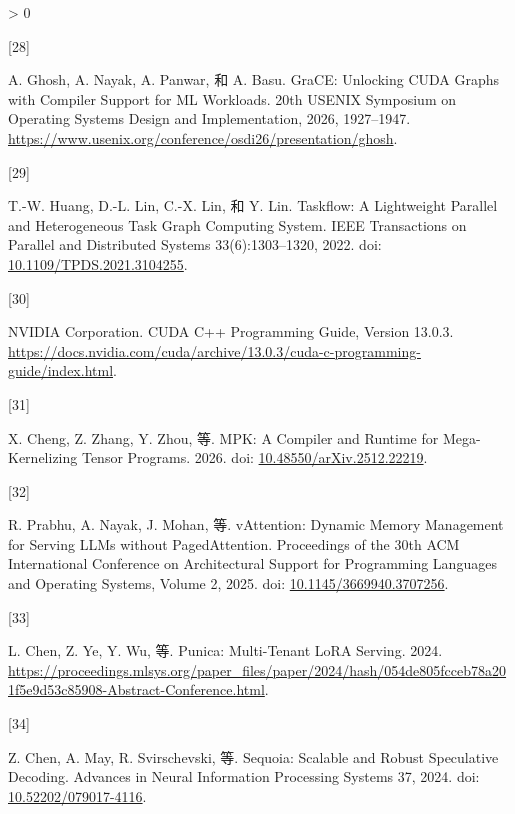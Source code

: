 \documentclass[
  UTF8,
  zihao=5]{ctexart}
\newlength{\cslhangindent}
\newlength{\csllabelwidth}
\newenvironment{CSLReferences}[2] %
 {%
  \setlength{\parindent}{0pt}
  \ifodd #1 \everypar{\setlength{\hangindent}{\cslhangindent}}\ignorespaces\fi
  \ifnum #2 > 0
  \setlength{\parskip}{#2\baselineskip}
  \fi
 }%
 {}
\newcommand{\CSLLeftMargin}[1]{\parbox[t]{\csllabelwidth}{#1}}
\newcommand{\CSLRightInline}[1]{\parbox[t]{\linewidth - \csllabelwidth}{#1}\par}
\begin{document}
\begin{CSLReferences}{0}{0}
\leavevmode{}%
\CSLLeftMargin{{[}28{]} }%
\CSLRightInline{A. Ghosh, A. Nayak, A. Panwar, 和 A. Basu. {GraCE}:
Unlocking {CUDA} Graphs with Compiler Support for {ML} Workloads. 20th
USENIX Symposium on Operating Systems Design and Implementation, 2026,
1927--1947.
\url{https://www.usenix.org/conference/osdi26/presentation/ghosh}.}

\leavevmode{}%
\CSLLeftMargin{{[}29{]} }%
\CSLRightInline{T.-W. Huang, D.-L. Lin, C.-X. Lin, 和 Y. Lin. {Taskflow:
A Lightweight Parallel and Heterogeneous Task Graph Computing System}.
IEEE Transactions on Parallel and Distributed Systems 33(6):1303--1320,
2022. doi:
\href{https://doi.org/10.1109/TPDS.2021.3104255}{10.1109/TPDS.2021.3104255}.}

\leavevmode{}%
\CSLLeftMargin{{[}30{]} }%
\CSLRightInline{NVIDIA Corporation. {CUDA C++ Programming Guide, Version
13.0.3}.
\url{https://docs.nvidia.com/cuda/archive/13.0.3/cuda-c-programming-guide/index.html}.}

\leavevmode{}%
\CSLLeftMargin{{[}31{]} }%
\CSLRightInline{X. Cheng, Z. Zhang, Y. Zhou, 等. MPK: A Compiler and
Runtime for Mega-Kernelizing Tensor Programs. 2026. doi:
\href{https://doi.org/10.48550/arXiv.2512.22219}{10.48550/arXiv.2512.22219}.}

\leavevmode{}%
\CSLLeftMargin{{[}32{]} }%
\CSLRightInline{R. Prabhu, A. Nayak, J. Mohan, 等. {vAttention}: Dynamic
Memory Management for Serving {LLMs} without {PagedAttention}.
Proceedings of the 30th ACM International Conference on Architectural
Support for Programming Languages and Operating Systems, Volume 2, 2025.
doi:
\href{https://doi.org/10.1145/3669940.3707256}{10.1145/3669940.3707256}.}

\leavevmode{}%
\CSLLeftMargin{{[}33{]} }%
\CSLRightInline{L. Chen, Z. Ye, Y. Wu, 等. Punica: Multi-Tenant LoRA
Serving. 2024.
\url{https://proceedings.mlsys.org/paper_files/paper/2024/hash/054de805fcceb78a201f5e9d53c85908-Abstract-Conference.html}.}

\leavevmode{}%
\CSLLeftMargin{{[}34{]} }%
\CSLRightInline{Z. Chen, A. May, R. Svirschevski, 等. Sequoia: Scalable
and Robust Speculative Decoding. Advances in Neural Information
Processing Systems 37, 2024. doi:
\href{https://doi.org/10.52202/079017-4116}{10.52202/079017-4116}.}


\end{CSLReferences}
\end{document}

